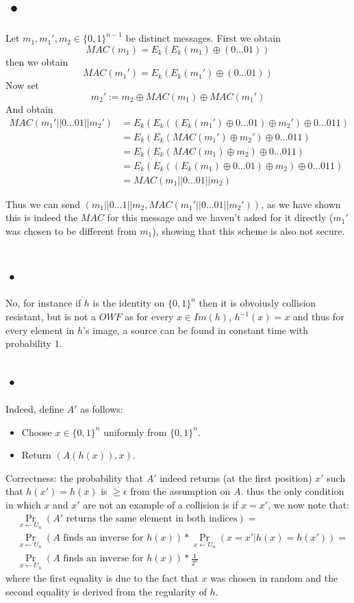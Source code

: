 \documentclass{article}
\begin{document}
\section{•}
Let $m_1,m_1', m_2\in \{0,1\}^{n-1}$ be distinct messages. First we obtain 
\[MAC(m_1) = E_k(E_k(m_1) \oplus(0...01))\]
 then we obtain 
\[MAC(m_1') = E_k(E_k(m_1') \oplus(0...01))\]
Now set 
\[m_2' := m_2 \oplus  MAC(m_1)  \oplus  MAC(m_1')\]
And obtain 
\begin{align*}
MAC(m_1'|| 0...01|| m_2') &= E_k( E_k( (E_k(m_1')\oplus 0...01 ) \oplus m_2')\oplus 0...011)\\
 &= E_k( E_k( MAC(m_1') \oplus m_2')\oplus 0...011)\\
 &= E_k( E_k( MAC(m_1) \oplus m_2)\oplus 0...011)\\
 &= E_k( E_k( (E_k(m_1)\oplus 0...01 ) \oplus m_2)\oplus 0...011)\\
 &= MAC(m_1||0...01||m_2)
\end{align*}

Thus we can send $(m_1||0...1|| m_2 , MAC(m_1'|| 0...01|| m_2'))$, as we have shown this is indeed the $MAC$ for this message and we haven't asked for it directly ($m_1'$ was  chosen to be different from $m_1$), showing that this scheme is also not secure.

\section{}
\subsection{•}
No, for instance if $h$ is the identity on $\{0,1\}^n$ then it is obvoiusly collision resistant, but is not a $OWF$ as for every $x \in Im(h)$, $h^{-1}(x) = x$ and thus for every element in $h$'s image, a source can be found in constant time with probability $1$. 

\subsection{•}
Indeed, define $A'$ as follows:
\begin{itemize}
\item Choose $x \in \{0,1\}^n$ uniformly from $\{0,1\}^n$.
\item Return $(A(h(x)), x)$.
\end{itemize}
Correctness: the probability that $A'$ indeed returns (at the first position) $x'$ such that $h(x') = h(x)$ is $\geq \epsilon$ from the assumption on $A$. thus the only condition in which $x$ and $x'$ are not an example of a collision is if $x = x'$,  we now note that:
\begin{align*}
&\Pr_{x \leftarrow U_n}(A' \mbox{ returns the same element in both indices}) =\\
&\Pr_{x \leftarrow U_n}(A \mbox{ finds an inverse for } h(x)) * \Pr_{x \leftarrow U_n}(x = x' | h(x) = h(x')) =\\
& \Pr_{x \leftarrow U_n}(A \mbox{ finds an inverse for } h(x)) * \frac{1}{2^n}
\end{align*}
where the first equality is due to the fact that $x$ was chosen in random and the second equality is derived from the regularity of $h$. 
\end{document}
